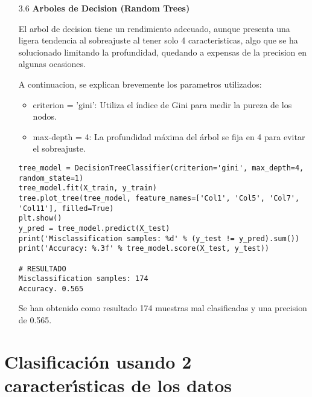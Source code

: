 \documentclass{article}
\begin{document}
\bigskip

\begin{itemize}

\item[3.6]  {\bf Arboles de Decision (Random Trees)}

El arbol de decision tiene un rendimiento adecuado, aunque presenta una ligera tendencia al sobreajuste al tener solo 4 caracteristicas, algo que se ha solucionado limitando la profundidad, quedando a expensas de la precision en algunas ocasiones.

A continuacion, se explican brevemente los parametros utilizados:

\begin{itemize}

\item
criterion = 'gini': Utiliza el índice de Gini para medir la pureza de los nodos.

\item
max-depth = 4: La profundidad máxima del árbol se fija en 4 para evitar el sobreajuste.

\end{itemize}

\begin{tcolorbox}[width=14cm]
\begin{scriptsize}
\begin{verbatim}
tree_model = DecisionTreeClassifier(criterion='gini', max_depth=4, random_state=1)
tree_model.fit(X_train, y_train)
tree.plot_tree(tree_model, feature_names=['Col1', 'Col5', 'Col7', 'Col11'], filled=True)
plt.show()
y_pred = tree_model.predict(X_test)
print('Misclassification samples: %d' % (y_test != y_pred).sum())
print('Accuracy: %.3f' % tree_model.score(X_test, y_test))

# RESULTADO
Misclassification samples: 174
Accuracy. 0.565
\end{verbatim}
\end{scriptsize}
\end{tcolorbox}

Se han obtenido como resultado 174 muestras mal clasificadas y una precision de 0.565.

\end{itemize}


\newpage

\section[4]{Clasificaci\'on usando 2 caracter\'{\i}sticas de los datos}
\end{document}
